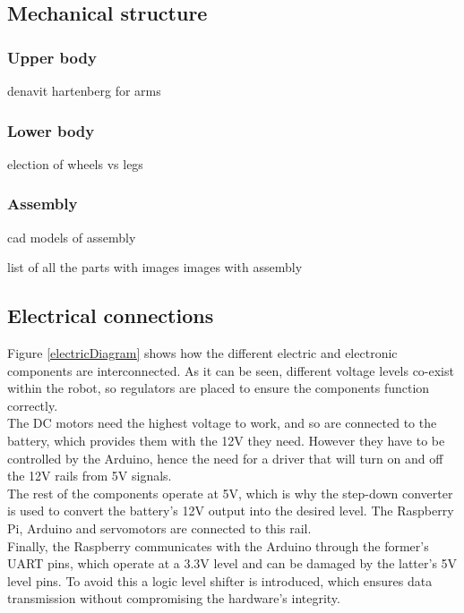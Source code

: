 \subsection{Mechanical structure}
\subsubsection{Upper body}
denavit hartenberg for arms

\subsubsection{Lower body}
election of wheels vs legs

\subsubsection{Assembly}
cad models of assembly

list of all the parts with images
images with assembly 


\subsection{Electrical connections}

Figure \ref{electricDiagram} shows how the different electric and electronic components are interconnected.  As it can be seen, different voltage levels co-exist within the robot, so regulators are placed to ensure the components function correctly. \\

The DC motors need the highest voltage to work, and so are connected to the battery, which provides them with the 12V they need. However they have to be controlled by the Arduino, hence the need for a driver that will turn on and off the 12V rails from 5V signals.\\

The rest of the components operate at 5V, which is why the step-down converter is used to convert the battery's 12V output into the desired level. The Raspberry Pi, Arduino and servomotors are connected to this rail.\\

Finally, the Raspberry communicates with the Arduino through the former's UART pins, which operate at a 3.3V level and can be damaged by the latter's 5V level pins. To avoid this a logic level shifter is introduced, which ensures data transmission without compromising the hardware's integrity.\\

